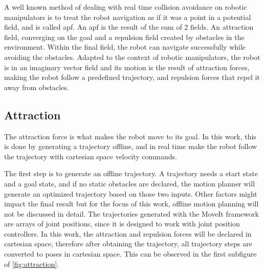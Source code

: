 \par A well known method of dealing with real time collision avoidance on robotic manipulators is to treat the robot navigation as if it was a point in a potential field, and is called \ac{apf}. An \ac{apf} is the result of the sum of 2 fields. An attraction field, converging on the goal and a repulsion field created by obstacles in the environment. Within the final field, the robot can navigate successfully while avoiding the obstacles. Adapted to the context of robotic manipulators, the robot is in an imaginary vector field and its motion is the result of attraction forces, making the robot follow a predefined trajectory, and repulsion forces that repel it away from obstacles.



\subsection{Attraction}
\label{ssec:attraction}


\par The attraction force is what makes the robot move to its goal. In this work, this is done by generating a trajectory offline, and in real time make the robot follow the trajectory with cartesian space velocity commands.

\par The first step is to generate an offline trajectory. A trajectory needs a start state and a goal state, and if no static obstacles are declared, the motion planner will generate an optimized trajectory based on those two inputs. Other factors might impact the final result but for the focus of this work, offline motion planning will not be discussed in detail. The trajectories generated with the MoveIt framework are arrays of joint positions, since it is designed to work with joint position controllers. In this work, the attraction and repulsion forces will be declared in cartesian space, therefore after obtaining the trajectory, all trajectory steps are converted to poses in cartesian space. This can be observed in the first subfigure of \autoref{fig:attraction}.

